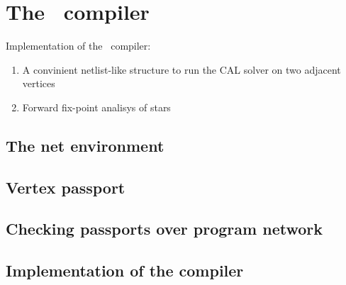 \chapter{The \ak\ compiler}

Implementation of the \ak\ compiler:
\begin{enumerate}
  \item A convinient netlist-like structure to run the CAL solver on two adjacent vertices
  \item Forward fix-point analisys of stars
\end{enumerate}


  \section{The net environment}
  \section{Vertex passport}
  \section{Checking passports over program network}
  \section{Implementation of the compiler}
